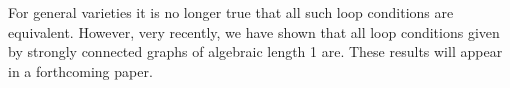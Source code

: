 \documentclass[a4paper]{article}
\def\inkpict#1#2#3{\medskip
\begin{figure}[!ht]
  \def\svgwidth{#1}
  \centering
     
  \caption{#3}
\end{figure}
}
\newtheorem{problem}{Open problem}
\begin{document}
For general varieties it is no longer true that all such loop conditions are equivalent. However, very recently, we have shown that all loop conditions given by strongly connected graphs of algebraic length 1 are. These results will appear in a forthcoming paper.


%
%



\end{document}
